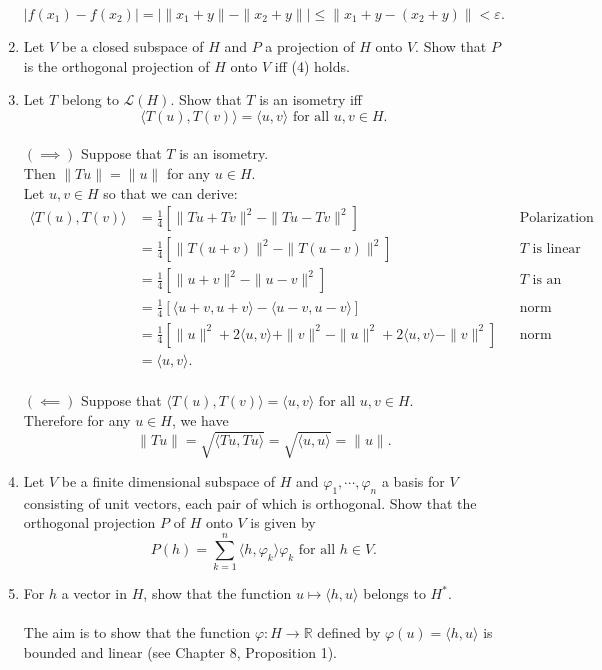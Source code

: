 \begin{enumerate}
    \[
        |f(x_1)-f(x_2)|=|\|x_1+y\|-\|x_2+y\||\le\|x_1+y-(x_2+y)\|<\varepsilon.
    \]
    \item Let $V$ be a closed subspace of $H$ and $P$ a projection of $H$ onto $V$. Show that $P$ is the orthogonal projection of $H$ onto $V$ iff (4) holds.
    \item Let $T$ belong to $\mathcal{L}(H)$. Show that $T$ is an isometry iff
    \[
        \langle T(u),T(v)\rangle=\langle u,v\rangle\text{ for all }u,v\in H.
    \]
    \\$(\implies)$ Suppose that $T$ is an isometry.
    \\Then $\|Tu\|=\|u\|$ for any $u\in H$.
    \\Let $u,v\in H$ so that we can derive:
    \begin{align*}
        \langle T(u),T(v)\rangle&=\frac{1}{4}[\|Tu+Tv\|^2-\|Tu-Tv\|^2]&&\text{Polarization identity}\\
        &=\frac{1}{4}[\|T(u+v)\|^2-\|T(u-v)\|^2]&&T\text{ is linear}\\
        &=\frac{1}{4}[\|u+v\|^2-\|u-v\|^2]&&T\text{ is an isometry}\\
        &=\frac{1}{4}[\langle u+v,u+v\rangle-\langle u-v,u-v\rangle]&&\text{norm induced by inner product}\\
        &=\frac{1}{4}[\|u\|^2+2\langle u,v\rangle+\|v\|^2-\|u\|^2+2\langle u,v\rangle-\|v\|^2]&&\text{norm induced by inner product}\\
        &=\langle u,v\rangle.
    \end{align*}
    \\$(\impliedby)$ Suppose that $\langle T(u),T(v)\rangle=\langle u,v\rangle\text{ for all }u,v\in H$.
    \\Therefore for any $u\in H$, we have 
    \[
        \|Tu\|=\sqrt{\langle Tu,Tu\rangle}=\sqrt{\langle u,u\rangle}=\|u\|.
    \]
    \item Let $V$ be a finite dimensional subspace of $H$ and $\varphi_1,\cdots,\varphi_n$ a basis for $V$ consisting of unit vectors, each pair of which is orthogonal. Show that the orthogonal projection $P$ of $H$ onto $V$ is given by 
    \[
        P(h)=\sum_{k=1}^n\langle h,\varphi_k\rangle\varphi_k\text{ for all }h\in V.
    \]
    \item For $h$ a vector in $H$, show that the function $u\mapsto\langle h,u\rangle$ belongs to $H^*$.\\
    \\The aim is to show that the function $\varphi:H\to\mathbb{R}$ defined by $\varphi(u)=\langle h,u\rangle$ is bounded and linear (see Chapter 8, Proposition 1).

\end{enumerate}
